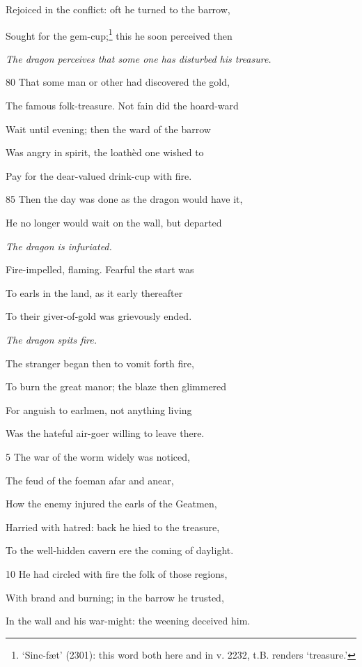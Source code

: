 Rejoiced in the conflict: oft he turned to the barrow,

Sought for the gem-cup;\footnote{‘Sinc-fæt’ (2301): this word both here and in v. 2232, t.B. renders
‘treasure.’} this he soon perceived then

\emph{The dragon perceives
that some
one has disturbed
his treasure.}

80
That some man or other had discovered the gold,

The famous folk-treasure. Not fain did the hoard-ward

Wait until evening; then the ward of the barrow

Was angry in spirit, the loathèd one wished to

Pay for the dear-valued drink-cup with fire.

85
Then the day was done as the dragon would have it,

He no longer would wait on the wall, but departed

\emph{The dragon is infuriated.}

Fire-impelled, flaming. Fearful the start was

To earls in the land, as it early thereafter

To their giver-of-gold was grievously ended.



\emph{The dragon spits
fire.}

The stranger began then to vomit forth fire,

To burn the great manor; the blaze then glimmered

For anguish to earlmen, not anything living

Was the hateful air-goer willing to leave there.

5
The war of the worm widely was noticed,

The feud of the foeman afar and anear,

How the enemy injured the earls of the Geatmen,

Harried with hatred: back he hied to the treasure,

To the well-hidden cavern ere the coming of daylight.

10
He had circled with fire the folk of those regions,

With brand and burning; in the barrow he trusted,

In the wall and his war-might: the weening deceived him.

